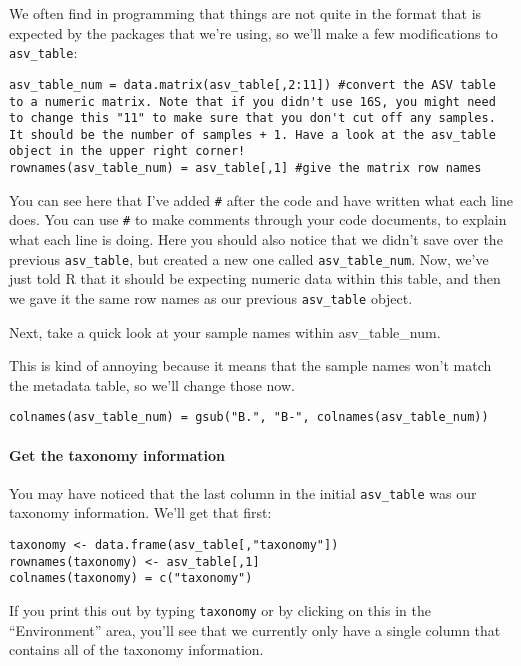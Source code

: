 \documentclass[
]{book}
\begin{document}
We often find in programming that things are not quite in the format that is expected by the packages that we're using, so we'll make a few modifications to \texttt{asv\_table}:

\begin{verbatim}
asv_table_num = data.matrix(asv_table[,2:11]) #convert the ASV table to a numeric matrix. Note that if you didn't use 16S, you might need to change this "11" to make sure that you don't cut off any samples. It should be the number of samples + 1. Have a look at the asv_table object in the upper right corner!
rownames(asv_table_num) = asv_table[,1] #give the matrix row names
\end{verbatim}

You can see here that I've added \texttt{\#} after the code and have written what each line does. You can use \texttt{\#} to make comments through your code documents, to explain what each line is doing. Here you should also notice that we didn't save over the previous \texttt{asv\_table}, but created a new one called \texttt{asv\_table\_num}. Now, we've just told R that it should be expecting numeric data within this table, and then we gave it the same row names as our previous \texttt{asv\_table} object.

Next, take a quick look at your sample names within asv\_table\_num.

This is kind of annoying because it means that the sample names won't match the metadata table, so we'll change those now.

\begin{verbatim}
colnames(asv_table_num) = gsub("B.", "B-", colnames(asv_table_num))
\end{verbatim}

\paragraph{Get the taxonomy information}\label{get-the-taxonomy-information-1}

You may have noticed that the last column in the initial \texttt{asv\_table} was our taxonomy information. We'll get that first:

\begin{verbatim}
taxonomy <- data.frame(asv_table[,"taxonomy"])
rownames(taxonomy) <- asv_table[,1]
colnames(taxonomy) = c("taxonomy")
\end{verbatim}

If you print this out by typing \texttt{taxonomy} or by clicking on this in the ``Environment'' area, you'll see that we currently only have a single column that contains all of the taxonomy information.
\end{document}
